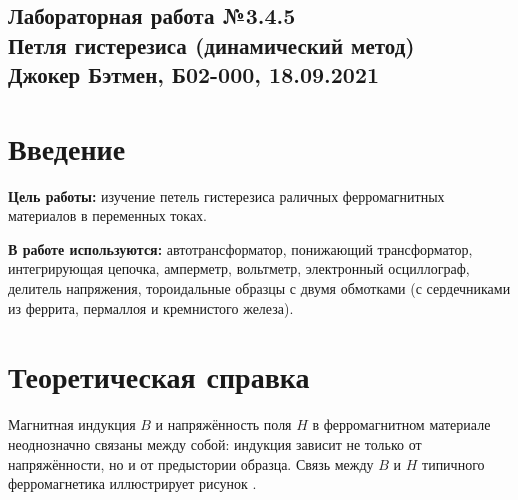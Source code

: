 \documentclass[a4paper,10pt]{article}
\begin{document}
  
\begin{center}
  \section*{Лабораторная работа №3.4.5 \\Петля гистерезиса (динамический метод)\\Джокер Бэтмен, Б02-000, 18.09.2021}
\end{center}  

\vspace{5mm}
\section*{Введение}

\begin{flushleft}
  \textbf{Цель работы:} изучение петель гистерезиса раличных ферромагнитных материалов в переменных токах.

\end{flushleft}

\begin{flushleft}
  \textbf{В работе используются:} автотрансформатор, понижающий трансформатор, интегрирующая цепочка, амперметр, вольтметр, электронный осциллограф, делитель напряжения, тороидальные образцы с двумя обмотками (с сердечниками из феррита, пермаллоя и кремнистого железа).

\end{flushleft}

\section*{Теоретическая справка}

Магнитная индукция $B$ и напряжённость поля $H$ в ферромагнитном материале неоднозначно связаны между собой: индукция зависит не только от напряжённости, но и от предыстории образца. Связь между $B$ и $H$ типичного ферромагнетика иллюстрирует рисунок .
\end{document}
